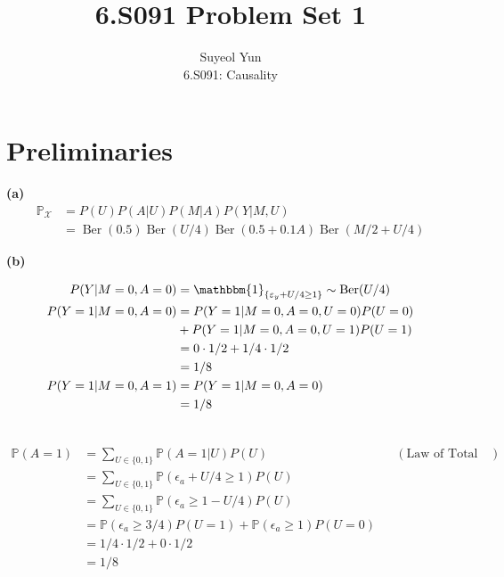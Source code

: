 \documentclass[10pt]{article}
\begin{document}
 
\title{6.S091 Problem Set 1}
\author{Suyeol Yun\\
6.S091: Causality}
\maketitle
 
\section{Preliminaries}
\textbf{(a)} 
\begin{align*}
\mathbb{P}_{\mathcal{X}} &= P(U)P(A|U)P(M|A)P(Y|M, U) \\
&= \operatorname{Ber}(0.5) \operatorname{Ber}(U/4) \operatorname{Ber}(0.5 + 0.1A)\operatorname{Ber}(M/2 + U/4)
\end{align*}

\textbf{(b)} 

\begin{align*}
    P(Y|M=0, A=0) &= \mathbbm{1}_{\left\{\varepsilon_y+U / 4 \geq 1\right\}} \sim \operatorname{Ber}(U/4)\\
    P(Y=1|M=0, A=0) &= P(Y=1|M=0, A=0, U=0)P(U=0) \\ &+ P(Y=1|M=0, A=0, U=1)P(U=1)\\
    &= 0 \cdot 1/2 + 1/4 \cdot 1/2\\
    &= 1/8\\
    P(Y=1|M=0, A=1) &= P(Y=1|M=0, A=0)\\
    &= 1/8
\end{align*}


\begin{align*}
\end{align*}


\begin{align*}
    \mathbb{P}(A=1) &=\sum_{U \in \{0,1\}}\mathbb{P}(A=1|U)P(U) && (\text{Law of Total Probability})\\
    &=\sum_{U \in \{0,1\}}\mathbb{P}(\epsilon_a+U/4\ge1)P(U) \\
    &=\sum_{U \in \{0,1\}}\mathbb{P}(\epsilon_a\ge1-U/4)P(U) \\
    &=\mathbb{P}(\epsilon_a\ge 3/4)P(U=1) + \mathbb{P}(\epsilon_a\ge 1)P(U=0) \\
    &=1/4\cdot1/2 + 0\cdot 1/2\\
    &=1/8
\end{align*}
\end{document}
